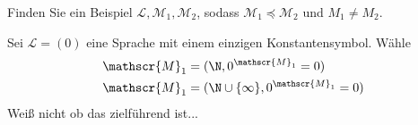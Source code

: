 
\begin{exercise}[143]
Finden Sie ein Beispiel $\mathscr{L},\mathscr{M}_1,\mathscr{M}_2$, sodass
$\mathscr{M}_1 \preccurlyeq \mathscr{M}_2$ und $M_1 \neq M_2$.
\end{exercise}


\begin{solution}
Sei $\mathscr{L} = (0)$ eine Sprache mit einem einzigen Konstantensymbol.
Wähle
\begin{align*}
  \mathscr{M}_1 &= (\N,0^{\mathscr{M}_1} = 0) \\
  \mathscr{M}_1 &= (\N \cup \{\infty\},0^{\mathscr{M}_1} = 0) \\
\end{align*}
Weiß nicht ob das zielführend ist...
\end{solution}

